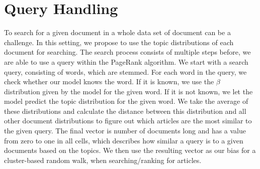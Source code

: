 \section{Query Handling}
To search for a given document in a whole data set of document can be a challenge. 
In this setting, we propose to use the topic distributions of each document for searching.
The search process consists of multiple steps before, we are able to use a query within the PageRank algorithm. 
We start with a search query, consisting of words, which are stemmed.
For each word in the query, we check whether our model knows the word.
If it is known, we use the $\beta$ distribution given by the model for the given word. 
If it is not known, we let the model predict the topic distribution for the given word.
We take the average of these distributions and calculate the distance between this distribution and all other document distributions to figure out which articles are the most similar to the given query.
The final vector is number of documents long and has a value from zero to one in all cells, which describes how similar a query is to a given documents based on the topics.
We then use the resulting vector as our bias for a cluster-based random walk, when searching/ranking for articles.
 